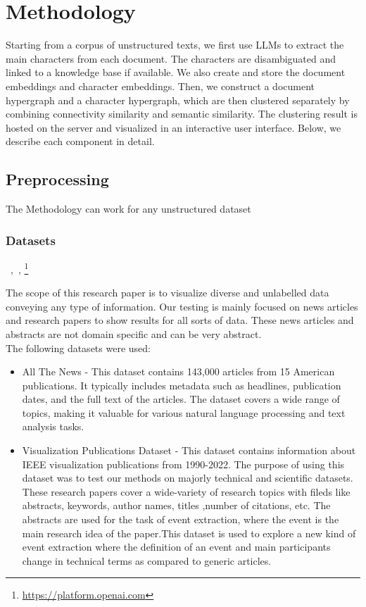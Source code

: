 \section{Methodology}\label{sec: methodology}
Starting from a corpus of unstructured texts, we first use LLMs to extract the main characters from each document.
The characters are disambiguated and linked to a knowledge base if available.
We also create and store the document embeddings and character embeddings.
Then, we construct a document hypergraph and a character hypergraph, which are then clustered separately by combining connectivity similarity and semantic similarity.
The clustering result is hosted on the server and visualized in an interactive user interface.
Below, we describe each component in detail.
\subsection{Preprocessing}
The Methodology can work for any unstructured dataset
\subsubsection{Datasets}
~\cite{allthenews},~\cite{Isenberg:2017:VMC}, 
\footnote{\url{https://platform.openai.com}}

The scope of this research paper is to visualize diverse and unlabelled data conveying any type of information. Our testing is mainly focused on news articles and research papers to show results for all sorts of data. These news articles and abstracts are not domain specific and can be very abstract. \\
The following datasets were used:
\begin{itemize}
    \item All The News - This dataset contains 143,000 articles from 15 American publications.  It typically includes metadata such as headlines, publication dates, and the full text of the articles. The dataset covers a wide range of topics, making it valuable for various natural language processing and text analysis tasks.
    \item Visualization Publications Dataset - This dataset contains information about IEEE visualization publications from 1990-2022. The purpose of using this dataset was to test our methods on majorly technical and scientific datasets. These research papers cover a wide-variety of research topics with fileds like abstracts, keywords, author names, titles ,number of citations, etc. The abstracts are used for the task of event extraction, where the event is the main research idea of the paper.This dataset is used to explore a new kind of event extraction where the definition of an event and main participants change in technical terms as compared to generic articles.
\end{itemize}
